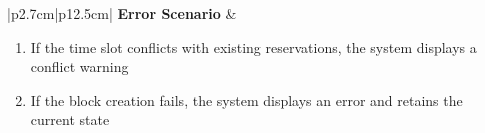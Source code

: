 \begin{table}[H]
\begin{tabular}{|p{2.7cm}|p{12.5cm}|}
        \hline
        \textbf{Error Scenario} & \begin{minipage}[t]{\linewidth}
                                      \begin{enumerate}[topsep=0pt,itemsep=1pt,parsep=0pt,partopsep=0pt]
                                          \item If the time slot conflicts with existing reservations, the system displays a
                                                conflict warning
                                          \item If the block creation fails, the system displays an error and retains the
                                                current state
                                      \end{enumerate}
                                  \end{minipage}             \\
        \hline
    \end{tabular}
    \label{tab:admin-block-usb-time-slot}
\end{table}
